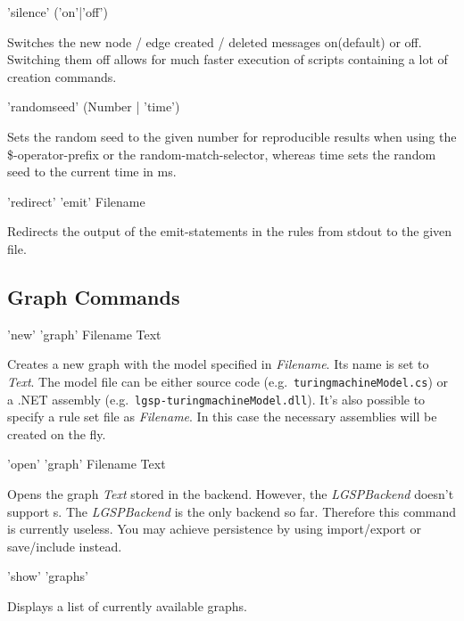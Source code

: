 \begin{rail}
'silence' ('on'|'off')
\end{rail}
Switches the new node / edge created / deleted messages on(default) or off. Switching them off allows for much faster execution of scripts containing a lot of creation commands.

\begin{rail}
'randomseed' (Number | 'time')
\end{rail}
Sets the random seed to the given number for reproducible results when using the \$-operator-prefix or the random-match-selector, whereas time sets the random seed to the current time in ms.

\begin{rail}
'redirect' 'emit' Filename
\end{rail}
Redirects the output of the emit-statements in the rules from stdout to the given file.


\subsection{Graph Commands}
\label{graphcommands}

\begin{rail}
  'new' 'graph' Filename Text 
\end{rail}
Creates a new graph with the model specified in \emph{Filename}. Its name is set to \emph{Text}. 
The model file can be either source code (e.g.\ \texttt{turing\textunderscore machineModel.cs}) or a .NET assembly (e.g.\ \texttt{lgsp-turing\textunderscore machineModel.dll}).
It's also possible to specify a rule set file as \emph{Filename}. 
In this case the necessary assemblies will be created on the fly.

\begin{rail}
  'open' 'graph' Filename Text
\end{rail}
Opens the graph \emph{Text} stored in the backend. However, the \emph{LGSPBackend} doesn't support s. The \emph{LGSPBackend} is the only backend so far. Therefore this command is currently useless. You may achieve persistence by using import/export or save/include instead.

\begin{rail}
  'show' 'graphs'
\end{rail}
Displays a list of currently available graphs.

